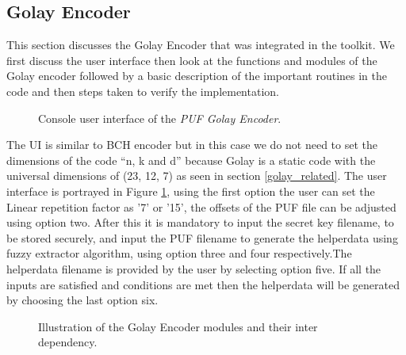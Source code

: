 	\subsection{Golay Encoder}
	This section discusses the Golay Encoder that was integrated in the toolkit. We first discuss the user interface then look at the functions and modules of the Golay encoder followed by a basic description of the important routines in the code and then steps taken to verify the implementation.\\

	\begin{figure}
	\centering
	\caption{Console user interface of the \emph{PUF Golay Encoder}.}
	\label{img:golay_enc_ui}
	\end{figure}
	The UI is similar to BCH encoder but in this case we do not need to set the dimensions of the code ``n, k and d'' because Golay is a static code with the universal dimensions of (23, 12, 7) as seen in section \ref{golay_related}. The user interface is portrayed in Figure \ref{img:golay_enc_ui}, using the first option the user can set the Linear repetition factor as '7' or '15', the offsets of the PUF file can be adjusted using option two. After this it is mandatory to input the secret key filename, to be
	stored securely, and input the PUF filename to generate the helperdata using fuzzy extractor algorithm, using option three and four respectively.The helperdata filename is provided by the user by selecting option five. If all the inputs are satisfied and conditions are met then the helperdata will be generated by choosing the last option six.\\


	\begin{figure}
	\centering
	\caption{Illustration of the Golay Encoder modules and their inter dependency.}
	\label{img:golay_enc_funcs}
	\end{figure}

